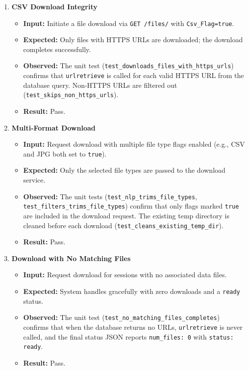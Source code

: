 \documentclass[12pt, titlepage]{article}
\begin{document}
\begin{enumerate}[label=\textbf{FR6-T\arabic*:}, leftmargin=*, labelsep=1em]
\sloppy

  \item \textbf{CSV Download Integrity}
  \begin{itemize}
    \item \textbf{Input:} Initiate a file download via \texttt{GET /files/} with \texttt{Csv\_Flag=true}.
    \item \textbf{Expected:} Only files with HTTPS URLs are downloaded; the download completes successfully.
    \item \textbf{Observed:} The unit test (\texttt{test\_\allowbreak{}downloads\_\allowbreak{}files\_\allowbreak{}with\_\allowbreak{}https\_\allowbreak{}urls})
      confirms that \texttt{urlretrieve} is called for each valid HTTPS URL from the database query.
      Non-HTTPS URLs are filtered out (\texttt{test\_\allowbreak{}skips\_\allowbreak{}non\_\allowbreak{}https\_\allowbreak{}urls}).
    \item \textbf{Result:} Pass.
  \end{itemize}

  \item \textbf{Multi-Format Download}
  \begin{itemize}
    \item \textbf{Input:} Request download with multiple file type flags enabled (e.g., CSV and JPG both set to \texttt{true}).
    \item \textbf{Expected:} Only the selected file types are passed to the download service.
    \item \textbf{Observed:} The unit tests (\texttt{test\_\allowbreak{}nlp\_\allowbreak{}trims\_\allowbreak{}file\_\allowbreak{}types},
      \texttt{test\_\allowbreak{}filters\_\allowbreak{}trims\_\allowbreak{}file\_\allowbreak{}types}) confirm that only flags marked \texttt{true} are
      included in the download request. The existing temp directory is cleaned before each download
      (\texttt{test\_\allowbreak{}cleans\_\allowbreak{}existing\_\allowbreak{}temp\_\allowbreak{}dir}).
    \item \textbf{Result:} Pass.
  \end{itemize}

  \item \textbf{Download with No Matching Files}
  \begin{itemize}
    \item \textbf{Input:} Request download for sessions with no associated data files.
    \item \textbf{Expected:} System handles gracefully with zero downloads and a \texttt{ready} status.
    \item \textbf{Observed:} The unit test (\texttt{test\_\allowbreak{}no\_\allowbreak{}matching\_\allowbreak{}files\_\allowbreak{}completes}) confirms
      that when the database returns no URLs, \texttt{urlretrieve} is never called, and the final status
      JSON reports \texttt{num\_files: 0} with \texttt{status: ready}.
    \item \textbf{Result:} Pass.
  \end{itemize}


\end{enumerate}
\end{document}
